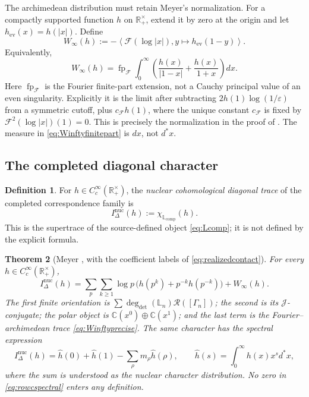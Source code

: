 \documentclass[11pt]{amsart}
\newtheorem{theorem}{Theorem}[section]
\theoremstyle{definition}
\newtheorem{definition}[theorem]{Definition}
\theoremstyle{remark}
\newcommand{\C}{\mathbb C}
\newcommand{\R}{\mathbb R}
\begin{document}
The archimedean distribution must retain Meyer's normalization.  For a
compactly supported function $h$ on $\R_+^\times$, extend it by zero at the
origin and let $h_{\mathrm{ev}}(x)=h(|x|)$.  Define
\begin{equation}\label{eq:Winftyprecise}
 W_\infty(h):=-\left\langle\mathcal F(\log|x|),
                 y\longmapsto h_{\mathrm{ev}}(1-y)\right\rangle.
\end{equation}
Equivalently,
\begin{equation}\label{eq:Winftyfinitepart}
 W_\infty(h)=\operatorname{fp}_{\mathcal F}\int_0^\infty
 \left(\frac{h(x)}{|1-x|}+\frac{h(x)}{1+x}\right)dx.
\end{equation}
Here $\operatorname{fp}_{\mathcal F}$ is the Fourier finite-part extension,
not a Cauchy principal value of an even singularity.  Explicitly it is the
limit after subtracting $2h(1)\log(1/\varepsilon)$ from a symmetric cutoff,
plus $c_{\mathcal F}h(1)$, where the unique constant $c_{\mathcal F}$ is
fixed by
$\mathcal F^2(\log|x|)(1)=0$.  This is precisely the normalization in the
proof of \cite[Theorem~5.8]{MeyerZeta}.  The measure in
\eqref{eq:Winftyfinitepart} is $dx$, not $d^*x$.

\subsection{The completed diagonal character}

\begin{definition}\label{def:nuclearintersection}
For $h\in C_c^\infty(\R_+^\times)$, the \emph{nuclear cohomological
diagonal trace} of the completed correspondence family is
\begin{equation}\label{eq:nuclearintersection}
 I_\Delta^{\mathrm{nuc}}(h)
 :=\chi_{\mathbb L_{\mathrm{comp}}}(h).
\end{equation}
This is the supertrace of the source-defined object
\eqref{eq:Lcomp}; it is not defined by the explicit formula.
\end{definition}

\begin{theorem}[Meyer {\cite[Theorem~5.8]{MeyerZeta}}, with the coefficient labels of \eqref{eq:realizedcontact}]
\label{thm:rowc}
For every $h\in C_c^\infty(\R_+^\times)$,
\begin{equation}\label{eq:rowcidentity}
 \boxed{
 I_\Delta^{\mathrm{nuc}}(h)=
 \sum_p\sum_{k\geq1}\log p\,
 \bigl(h(p^k)+p^{-k}h(p^{-k})\bigr)+W_\infty(h).}
\end{equation}
The first finite orientation is
$\sum\deg_{\det}(\mathbb L_n)\mathcal R([\Gamma_n])$;
the second is its $\mathscr J$-conjugate; the polar object is
$\C(x^0)\oplus\C(x^1)$; and the last term is the Fourier--archimedean trace
\eqref{eq:Winftyprecise}.  The same character has the spectral expression
\begin{equation}\label{eq:rowcspectral}
 I_\Delta^{\mathrm{nuc}}(h)=\widehat h(0)+\widehat h(1)
 -\sum_\rho m_\rho\widehat h(\rho),\qquad
 \widehat h(s)=\int_0^\infty h(x)x^s d^*x,
\end{equation}
where the sum is understood as the nuclear character distribution.  No zero
in \eqref{eq:rowcspectral} enters any definition.
\end{theorem}
\end{document}

